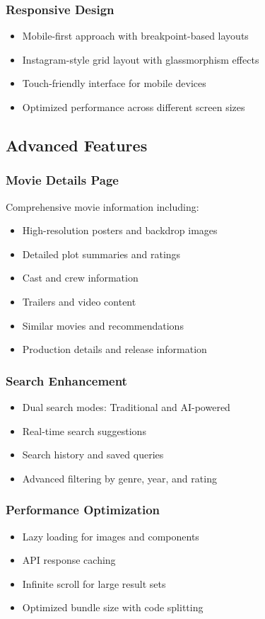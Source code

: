 \documentclass[12pt,a4paper]{article}
\begin{document}
\subsubsection{Responsive Design}
\begin{itemize}
    \item Mobile-first approach with breakpoint-based layouts
    \item Instagram-style grid layout with glassmorphism effects
    \item Touch-friendly interface for mobile devices
    \item Optimized performance across different screen sizes
\end{itemize}

\subsection{Advanced Features}

\subsubsection{Movie Details Page}
Comprehensive movie information including:
\begin{itemize}
    \item High-resolution posters and backdrop images
    \item Detailed plot summaries and ratings
    \item Cast and crew information
    \item Trailers and video content
    \item Similar movies and recommendations
    \item Production details and release information
\end{itemize}

\subsubsection{Search Enhancement}
\begin{itemize}
    \item Dual search modes: Traditional and AI-powered
    \item Real-time search suggestions
    \item Search history and saved queries
    \item Advanced filtering by genre, year, and rating
\end{itemize}

\subsubsection{Performance Optimization}
\begin{itemize}
    \item Lazy loading for images and components
    \item API response caching
    \item Infinite scroll for large result sets
    \item Optimized bundle size with code splitting
\end{itemize}
\end{document}
